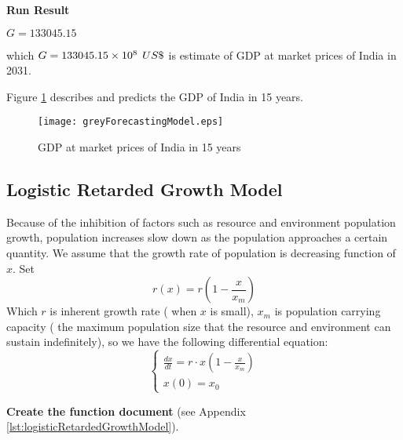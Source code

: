 \documentclass[tcn = 45538, sheet = true, abstract = true]{mcmthesis}
\begin{document}
\textbf{Run Result}

$G = 133045.15$

which $G = 133045.15 \times 10^8\hspace{1 ex} US\$$ is estimate of GDP at market prices of India in 2031.

Figure \ref{fig:GDPOfIndiaIn15Years} describes and predicts the GDP of India in 15 years.

\begin{figure}[]
\small
\centering
\texttt{[image: greyForecastingModel.eps]}
\caption{GDP at market prices of India in 15 years} \label{fig:GDPOfIndiaIn15Years}
\end{figure}

\subsection{Logistic Retarded Growth Model}

\hspace{1.5 em} Because of the inhibition of factors such as resource and environment population growth, 
population increases slow down as the population approaches a certain quantity.
We assume that the growth rate of population is decreasing function of $x$.
Set
\begin{equation}
r(x) = r( 1 - \frac{x}{x_{m}} )
\end{equation}
Which $r$ is inherent growth rate 
( when $x$ is small), 
$x_{m}$ is population carrying capacity 
( the maximum population size that the resource and environment can sustain indefinitely),
so we have the following differential equation: 
\begin{equation}
\begin{cases}
\frac{dx}{dt} = r \cdot x ( 1 - \frac{x}{x_{m}} ) \\
x(0) = x_{0}  
\end{cases}
\end{equation}

\textbf{Create the function document} 
(see Appendix \ref{lst:logisticRetardedGrowthModel}).
\end{document}
